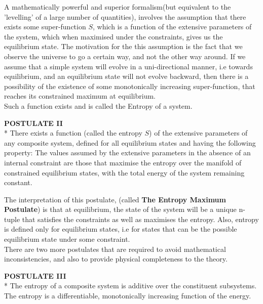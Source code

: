 \documentclass[oneside]{book}
\begin{document}
A mathematically powerful and superior formalism(but equivalent to the 'levelling' of a large number of quantities), involves the assumption that there exists some super-function $S$, which is a function of the extensive parameters of the system, which when maximised under the constraints, gives us the equilibrium state. The motivation for the this assumption is the fact that we observe the universe to go a certain way, and not the other way around. If we assume that a simple system will evolve in a uni-directional manner, i.e towards equilibrium, and an equilibrium state will not evolve backward, then there is a possibility of the existence of some monotonically increasing super-function, that reaches its constrained maximum at equilibrium.\\

Such a function exists and is called the Entropy of a system.\\

\begin{mdframed}[style=exercise]
\textbf{POSTULATE II}
\\* There exists a function (called the entropy $S$) of the extensive parameters of any composite system, defined for all equilibrium states and having the following property: The values assumed by the extensive parameters in the absence of an internal constraint are those that maximise the entropy over the manifold of constrained equilibrium states, with the total energy of the system remaining constant.\\ 
\end{mdframed}

The interpretation of this postulate, (called \textbf{The Entropy Maximum Postulate}) is that at equilibrium, the state of the system will be a unique n-tuple that satisfies the constraints as well as maximises the entropy. Also, entropy is defined only for equilibrium states, i.e for states that can be the possible equilibrium state under some constraint. \\

There are two more postulates that are required to avoid mathematical  inconsistencies, and also to provide physical completeness to the theory.

\begin{mdframed}[style=exercise]
\textbf{POSTULATE III}
\\* The entropy of a composite system is additive over the constituent subsystems. The entropy is a differentiable, monotonically increasing function of the energy.\\ 
\end{mdframed}
\end{document}
